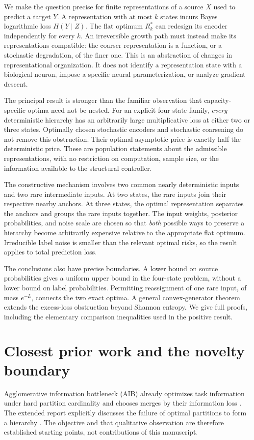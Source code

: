 \documentclass[11pt]{article}
\theoremstyle{remark}\newtheorem{remark}[theorem]{Remark}
\begin{document}
We make the question precise for finite representations of a source $X$
used to predict a target $Y$. A representation with at most $k$ states incurs
Bayes logarithmic loss $H(Y\mid Z)$. The flat optimum $R_k^*$ can redesign
its encoder independently for every $k$. An irreversible growth path must
instead make its representations compatible: the coarser representation is
a function, or a stochastic degradation, of the finer one. This is an
abstraction of changes in representational organization. It does not
identify a representation state with a biological neuron, impose a specific
neural parameterization, or analyze gradient descent.

The principal result is stronger than the familiar observation that
capacity-specific optima need not be nested. For an explicit four-state
family, \emph{every} deterministic hierarchy has an arbitrarily large
multiplicative loss at either two or three states. Optimally chosen stochastic
encoders and stochastic coarsening do not remove this obstruction. Their
optimal asymptotic price is exactly half the deterministic price. These are
population statements about the admissible representations, with no
restriction on computation, sample size, or the information available to the
structural controller.

The constructive mechanism involves two common nearly deterministic inputs
and two rare intermediate inputs. At two states, the rare inputs join their
respective nearby anchors. At three states, the optimal representation
separates the anchors and groups the rare inputs together. The input weights,
posterior probabilities, and noise scale are chosen so that \emph{both}
possible ways to preserve a hierarchy become arbitrarily expensive relative
to the appropriate flat optimum. Irreducible label noise is smaller than the
relevant optimal risks, so the result applies to total prediction loss.

The conclusions also have precise boundaries. A lower bound on source
probabilities gives a uniform upper bound in the four-state problem,
without a lower bound on label probabilities. Permitting reassignment of
one rare input, of mass $e^{-L}$, connects the two exact optima. A general
convex-generator theorem extends the excess-loss obstruction beyond Shannon
entropy. We give full proofs, including the elementary comparison inequalities
used in the positive result.

\section{Closest prior work and the novelty boundary}
Agglomerative information bottleneck (AIB) already optimizes task information
under hard partition cardinality and chooses merges by their information loss
\cite{slonim1999}. The extended report explicitly discusses the failure of
optimal partitions to form a hierarchy \cite[Section 3.1]{slonimreport}.
The objective and that qualitative observation are therefore established
starting points, not contributions of this manuscript.
\end{document}
